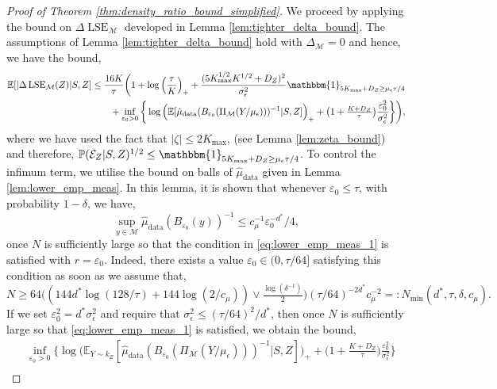 \documentclass[10pt]{article}
\theoremstyle{plain}
\theoremstyle{definition}
\theoremstyle{remark}
\newcommand{\M}{{\mathcal{M}}}
\newcommand{\lse}{\operatorname{LSE}}
\newcommand{\E}{\mathbb{E}}
\newcommand{\prob}{\mathbb{P}}
\newcommand{\hmud}{\hat{\mu}_{\operatorname{data}}}
\newcommand{\gap}{\Delta_\M}
\begin{document}
\begin{proof}[Proof of Theorem \ref{thm:density_ratio_bound_simplified}]
We proceed by applying the bound on \(\Delta \lse_\M\) developed in Lemma \ref{lem:tighter_delta_bound}. The assumptions of Lemma \ref{lem:tighter_delta_bound} hold with \(\gap = 0\) and hence, we have the bound,
\begin{align}
    \E[|\Delta \lse_\M(Z)|S, Z] &\leq \frac{16 K}{\tau} \bigg ( 1 + \log \Big ( \frac{\tau}{K} \Big )_+ + \frac{(5K_{\max}^{1/2} K^{1/2} + D_Z)^2}{\sigma_\epsilon^2} \mathbbm{1}_{5 K_{\max} + D_Z \geq \mu_\epsilon \tau/4} \nonumber\\
    & \qquad + \inf_{\varepsilon_0 > 0} \bigg \{ \log \Big ( \E [ \hat{\mu}_{\operatorname{data}}(B_{\varepsilon_0}(\Pi_\M(Y/\mu_\epsilon)))^{-1} | S, Z ] \Big )_+ + \big ( 1 + \tfrac{K + D_Z}{\tau} \big ) \frac{\varepsilon_0^2}{\sigma_\epsilon^2} \bigg \} \bigg ),\label{eq:thm_10}
\end{align}
where we have used the fact that \(|\zeta| \leq 2 K_{\max}\), (see Lemma \ref{lem:zeta_bound}) and therefore, \(\prob(\mathcal{E}_Z|S, Z)^{1/2} \leq \mathbbm{1}_{5 K_{\max} + D_Z \geq \mu_\epsilon \tau / 4}\). To control the infimum term, we utilise the bound on balls of \(\hmud\) given in Lemma \ref{lem:lower_emp_meas}. In this lemma, it is shown that whenever \(\varepsilon_0 \leq \tau\), with probability \(1-\delta\), we have,
\begin{equation}\label{eq:geometric_bias_3}
    \sup_{y \in \M} \hat{\mu}_{\operatorname{data}}(B_{\varepsilon_0}(y))^{-1} \leq c_\mu^{-1} \varepsilon_0^{-d^*} / 4,
\end{equation}
once \(N\) is sufficiently large so that the condition in \eqref{eq:lower_emp_meas_1} is satisfied with \(r = \varepsilon_0\). Indeed, there exists a value \(\varepsilon_0 \in (0, \tau/64]\) satisfying this condition as soon as we assume that,
\begin{equation}
    N \geq 64 \Big ( (144 d^* \log(128/\tau) + 144 \log(2/c_\mu)) \vee \tfrac{\log(\delta^{-1})}{2} \Big ) (\tau/64)^{-2d^*} c_\mu^{-2} =: N_{\min}(d^*, \tau, \delta, c_\mu).\label{eq:N_min}
\end{equation}
If we set \(\varepsilon_0^2 = d^* \sigma_\epsilon^2\) and require that \(\sigma_\epsilon^2 \leq (\tau/64)^2/d^*\), then once \(N\) is sufficiently large so that \eqref{eq:lower_emp_meas_1} is satisfied, we obtain the bound,
\begin{align}
    &\inf_{\varepsilon_0 > 0} \bigg \{ \log \Big ( \E_{Y \sim k_Z} [ \hat{\mu}_{\operatorname{data}}(B_{\varepsilon_0}(\Pi_\M(Y/\mu_\epsilon)))^{-1} | S, Z ] \Big )_+ + \big ( 1 + \tfrac{K + D_Z}{\tau} \big ) \frac{\varepsilon_0^2}{\sigma_\epsilon^2} \bigg \}\nonumber\\

\end{align}
\end{proof}
\end{document}
